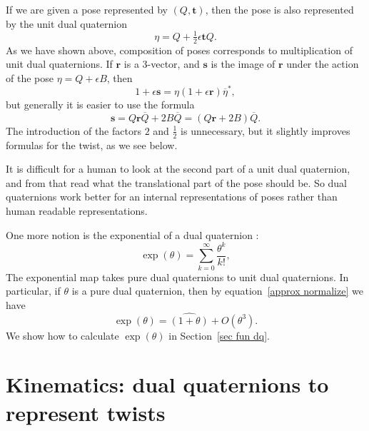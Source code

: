 \documentclass[reqno,12pt]{amsart}
\begin{document}
If we are given a pose represented by $(Q, \bm t)$, then the pose is also represented by the unit dual quaternion
\begin{equation}
\label{pose as dual quaternion}
\eta = Q + \tfrac12 \epsilon \bm t Q.
\end{equation}
As we have shown above, composition of poses corresponds to multiplication of unit dual quaternions.  If $\bm r$ is a 3-vector, and $\bm s$ is the image of $\bm r$ under the action of the pose $\eta = Q + \epsilon B$, then
\begin{equation}
\label{defn of pose on 3-vector}
1 + \epsilon \bm s = \eta (1 + \epsilon \bm r) \overline\eta^* ,
\end{equation}
but generally it is easier to use the formula
\begin{equation}
\label{pose on 3-vector}
\bm s = Q \bm r \overline Q + 2 B \overline Q = (Q \bm r + 2 B) \overline Q .
\end{equation}
The introduction of the factors $2$ and $\frac12$ is unnecessary, but it slightly improves formulas for the twist, as we see below.

It is difficult for a human to look at the second part of a unit dual quaternion, and from that read what the translational part of the pose should be.  So dual quaternions work better for an internal representations of poses rather than human readable representations.

One more notion is the exponential of a dual quaternion \cite{wang-et-al}:
\begin{equation}
\label{exponential}
\exp(\theta) = \sum_{k=0}^\infty \frac{\theta^k}{k!},
\end{equation}
The exponential map takes pure dual quaternions to unit dual quaternions.  In particular, if $\theta$ is a pure dual quaternion, then by equation~\eqref{approx normalize} we have
\begin{equation}
\label{exp-normal}
\exp(\theta) = \widehat{(1+\theta)} + O(\theta^3) .
\end{equation}
We show how to calculate $\exp(\theta)$ in Section~\ref{sec fun dq}.

\section{Kinematics: dual quaternions to represent twists}
\label{sec twists}
\end{document}
